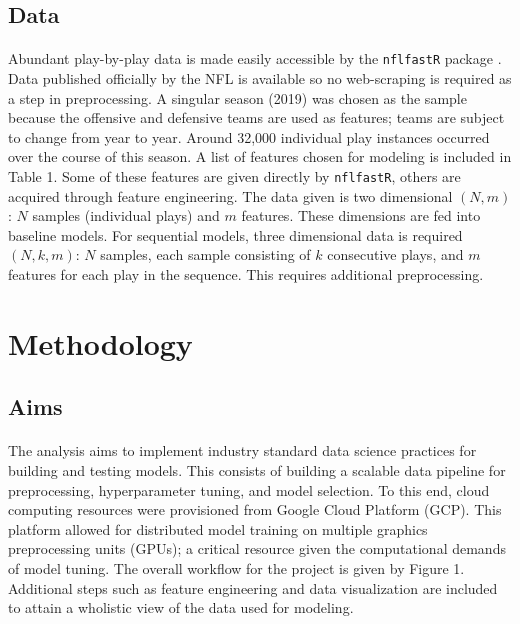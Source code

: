 \documentclass[11pt]{article}
\begin{document}
    \begin{multicols*}{2}
        \subsection{Data}
            \paragraph{}
                Abundant play-by-play data is made easily accessible by the \texttt{nflfastR} package \cite{Carl22}. 
                Data published officially by the NFL is available so no web-scraping is required as a step in preprocessing.
                A singular season (2019) was chosen as the sample because the offensive and defensive teams are used as features; teams are subject to change from year to year. 
                Around 32,000 individual play instances occurred over the course of this season.  
                A list of features chosen for modeling is included in Table 1. 
                Some of these features are given directly by \texttt{nflfastR}, others are acquired through feature engineering.
                The data given is two dimensional $(N,m)$: $N$ samples (individual plays) and $m$ features. 
                These dimensions are fed into baseline models.
                For sequential models, three dimensional data is required $(N,k,m)$: $N$ samples, each sample consisting of $k$ consecutive plays, and $m$ features for each play in the sequence. 
                This requires additional preprocessing.

    \section{Methodology}

        \subsection{Aims}
            \paragraph{}
                The analysis aims to implement industry standard data science practices for building and testing models.
                This consists of building a scalable data pipeline for preprocessing, hyperparameter tuning, and model selection.
                To this end, cloud computing resources were provisioned from Google Cloud Platform (GCP). 
                This platform allowed for distributed model training on multiple graphics preprocessing units (GPUs); a critical resource given the computational demands of model tuning.  
                The overall workflow for the project is given by Figure 1. 
                Additional steps such as feature engineering and data visualization are included to attain a wholistic view of the data used for modeling.
    
        \end{multicols*}
\end{document}
